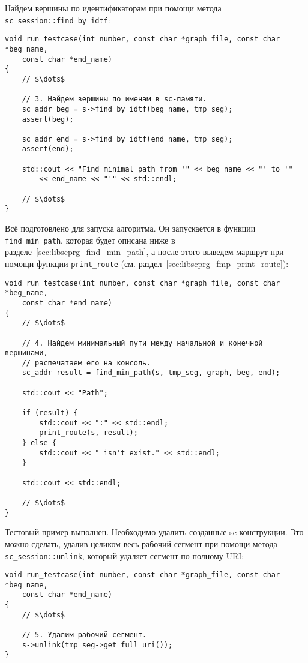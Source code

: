 Найдем вершины по идентификаторам при помощи метода
\lstinline|sc_session::find_by_idtf|:

\begin{lstlisting}[texcl]
void run_testcase(int number, const char *graph_file, const char *beg_name,
    const char *end_name)
{
    // $\dots$

    // 3. Найдем вершины по именам в sc-памяти.
    sc_addr beg = s->find_by_idtf(beg_name, tmp_seg);
    assert(beg);

    sc_addr end = s->find_by_idtf(end_name, tmp_seg);
    assert(end);

    std::cout << "Find minimal path from '" << beg_name << "' to '"
        << end_name << "'" << std::endl;

    // $\dots$
}
\end{lstlisting}

Всё подготовлено для запуска алгоритма. Он запускается в функции
\lstinline|find_min_path|, которая будет описана ниже в
разделе~\ref{sec:libscprg_find_min_path}, а после этого выведем
маршрут при помощи функции \lstinline|print_route|
(см. раздел~\ref{sec:libscprg_fmp_print_route}):

\begin{lstlisting}[texcl]
void run_testcase(int number, const char *graph_file, const char *beg_name,
    const char *end_name)
{
    // $\dots$

    // 4. Найдем минимальный пути между начальной и конечной вершинами,
    // распечатаем его на консоль.
    sc_addr result = find_min_path(s, tmp_seg, graph, beg, end);

    std::cout << "Path";

    if (result) {
        std::cout << ":" << std::endl;
        print_route(s, result);
    } else {
        std::cout << " isn't exist." << std::endl;
    }

    std::cout << std::endl;

    // $\dots$
}
\end{lstlisting}

Тестовый пример выполнен. Необходимо удалить созданные
sc-конструкции. Это можно сделать, удалив целиком весь рабочий сегмент
при помощи метода \lstinline|sc_session::unlink|, который удаляет
сегмент по полному URI:

\begin{lstlisting}[texcl]
void run_testcase(int number, const char *graph_file, const char *beg_name,
    const char *end_name)
{
    // $\dots$

    // 5. Удалим рабочий сегмент.
    s->unlink(tmp_seg->get_full_uri());
}
\end{lstlisting}

